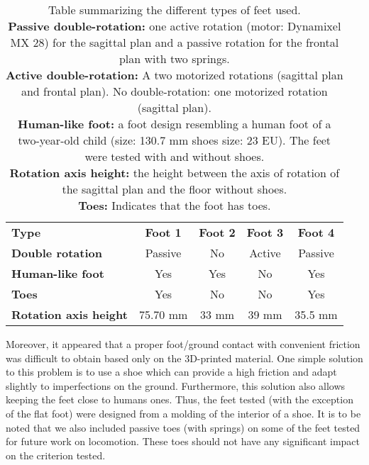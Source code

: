 \begin{table}
    \begin{center}
        \begin{tabular}{ l c c c c }
        \hline
        \textbf{Type} & \textbf{Foot 1} & \textbf{Foot 2} & \textbf{Foot 3} & \textbf{Foot 4}\\
        \textbf{Double rotation} & Passive & No & Active & Passive\\
        \textbf{Human-like foot} & Yes & Yes & No & Yes\\
        \textbf{Toes} & Yes & No & No & Yes\\
        \textbf{Rotation axis height} & 75.70 mm & 33 mm & 39 mm & 35.5 mm\\
        \hline

        \end{tabular}
        \caption{Table summarizing the different types of feet used.\\
        \textbf{Passive double-rotation:}  one active rotation (motor: Dynamixel MX 28) for the sagittal plan and a passive rotation for the frontal plan with two springs.\\
        \textbf{Active double-rotation:}  A two motorized rotations (sagittal plan and frontal plan). No double-rotation:  one motorized rotation (sagittal plan).\\
        \textbf{Human-like foot:} a foot design resembling a human foot of a two-year-old child (size: 130.7 mm shoes size: 23 EU). The feet were tested with and without shoes.\\
        \textbf{Rotation axis height:} the height between the axis of rotation of the sagittal plan and the floor without shoes.\\
        \textbf{Toes:} Indicates that the foot has toes.
        }
        \label{tab:table_feet}
    \end{center}
\end{table}


Moreover, it appeared that a proper foot/ground contact with convenient friction was difficult to obtain based only on the 3D-printed material. One simple solution to this problem is to use a shoe which can provide a high friction and adapt slightly to imperfections on the ground. Furthermore, this solution also allows keeping the feet close to humans ones. Thus, the feet tested (with the exception of the flat foot) were designed from a molding of the interior of a shoe. It is to be noted that we also included passive toes (with springs) on some of the feet tested for future work on locomotion. These toes should not have any significant impact on the criterion tested.


